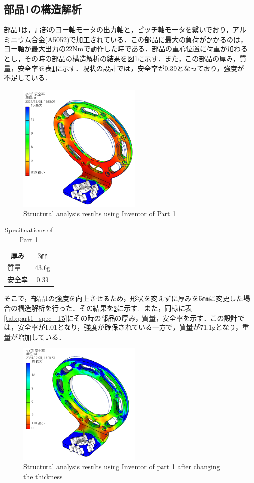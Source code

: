 \subsection{部品1の構造解析}
部品1は，肩部のヨー軸モータの出力軸と，ピッチ軸モータを繋いでおり，アルミニウム合金(A5052)で加工されている．この部品に最大の負荷がかかるのは，ヨー軸が最大出力の22Nmで動作した時である．部品の重心位置に荷重が加わるとし，その時の部品の構造解析の結果を図\ref{fig:T3_40}に示す．また，この部品の厚み，質量，安全率を表\ref{tab:part1_spec}に示す．現状の設計では，安全率が0.39となっており，強度が不足している．
\begin{figure}[h]
  \centering
  \includegraphics[width=6cm]{images/design/T3_40.png}
  \caption{Structural analysis results using Inventor of Part 1}
  \label{fig:T3_40}
\end{figure}
\begin{table}[h]
  \centering
  \begin{tabular}{lc}
    \hline
    \multicolumn{1}{c}{\textbf{厚み}} & 3㎜    \\ 
    質量                               & 43.6g \\ 
    安全率                              & 0.39  \\ \hline
  \end{tabular}
  \caption{Specifications of Part 1}
  \label{tab:part1_spec}
\end{table}
\clearpage
そこで，部品1の強度を向上させるため，形状を変えずに厚みを5㎜に変更した場合の構造解析を行った．その結果を\ref{fig:T5}に示す．また，同様に表\ref{tab:part1_spec_T5}にその時の部品の厚み，質量，安全率を示す．この設計では，安全率が1.01となり，強度が確保されている一方で，質量が71.1gとなり，重量が増加している．
\begin{figure}[h]
  \centering
  \includegraphics[width=6cm]{images/design/T5.png}
  \caption{Structural analysis results using Inventor of part 1 after changing the thickness}
  \label{fig:T5}
\end{figure}
